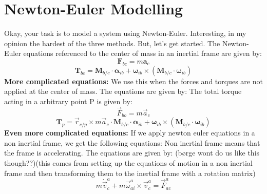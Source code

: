 \section{Newton-Euler Modelling}
Okay, your task is to model a system using Newton-Euler. Interesting, in my opinion the hardest of the three methods. But, let's get started.\newline
The Newton-Euler equations referenced to the center of mass in an inertial frame are given by:
\begin{equation}
    \mathbf{F}_{bc} = m \mathbf{a}_c
\end{equation}
\begin{equation}
    \mathbf{T}_{bc} = \mathbf{M}_{b/c} \cdot \boldsymbol{\alpha}_{ib} + \boldsymbol{\omega}_{ib} \times \left( \mathbf{M}_{b/c} \cdot \boldsymbol{\omega}_{ib} \right)
\end{equation}
\textbf{More complicated equations: } \newline
We use this when the forces and torques are not applied at the center of mass. The equations are given by:
The total torque acting in a arbitrary point P is given by:
\begin{equation}
    \vec{F}_{bo} = m \vec{a}_c
\end{equation}
\begin{equation}
    \mathbf{T}_{p} = \vec{r}_{c/p} \times m \vec{a}_c \cdot \mathbf{M}_{b/c} \cdot \boldsymbol{\alpha}_{ib} + \boldsymbol{\omega}_{ib} \times \left( \mathbf{M}_{b/c} \cdot \boldsymbol{\omega}_{ib} \right)
\end{equation}   
\textbf{Even more complicated equations: } \newline
If we apply newton euler equations in a non inertial frame, we get the following equations:
Non inertial frame means that the frame is accelerating. The equations are given by:
(børge wont do us like this though??)(this comes from setting up the equations of motion in a non inertial frame and then transforming them to the inertial frame with a rotation matrix)
\begin{equation}
    m \dot{\vec{v}}_c^a + m \vec{\omega}_{ai}^a \times \vec{v}_c^a = \vec{F}_{ac}^{a}
\end{equation}